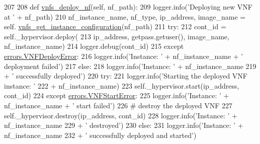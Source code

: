 \begin{DoxyCode}
207 
208     \textcolor{keyword}{def }\hyperlink{classvnfs__operations_1_1VNFSOperations_a304bb0780682b050cdf9d43e3f279ead}{vnfs\_deploy\_nf}(self, nf\_path):
209         logger.info(\textcolor{stringliteral}{'Deploying new VNF at '} + nf\_path)
210         nf\_instance\_name, nf\_type, ip\_address, image\_name = self.
      \hyperlink{classvnfs__operations_1_1VNFSOperations_a367f1d6fb6749b0a16af47381d43c874}{vnfs\_get\_instance\_configuration}(nf\_path)
211         \textcolor{keywordflow}{try}:
212             cont\_id  = self.\_hypervisor.deploy(
213                 ip\_address, getpass.getuser(), image\_name, nf\_instance\_name)
214             logger.debug(cont\_id)
215         \textcolor{keywordflow}{except} \hyperlink{classerrors_1_1VNFDeployError}{errors.VNFDeployError}:
216             logger.info(\textcolor{stringliteral}{'Instance: '} + nf\_instance\_name  + \textcolor{stringliteral}{' deployment failed'})
217         \textcolor{keywordflow}{else}:
218             logger.info(\textcolor{stringliteral}{'Instance: '} + nf\_instance\_name  
219                     + \textcolor{stringliteral}{' successfully deployed'})
220             \textcolor{keywordflow}{try}:
221                 logger.info(\textcolor{stringliteral}{'Starting the deployed VNF instance: '} 
222                     + nf\_instance\_name)
223                 self.\_hypervisor.start(ip\_address, cont\_id)
224             \textcolor{keywordflow}{except} \hyperlink{classerrors_1_1VNFStartError}{errors.VNFStartError}:
225                 logger.info(\textcolor{stringliteral}{'Instance: '} + nf\_instance\_name  + \textcolor{stringliteral}{' start failed'})
226                 \textcolor{comment}{# destroy the deployed VNF}
227                 self.\_hypervisor.destroy(ip\_address, cont\_id)
228                 logger.info(\textcolor{stringliteral}{'Instance: '} + nf\_instance\_name  
229                     + \textcolor{stringliteral}{' destroyed'})
230             \textcolor{keywordflow}{else}:
231                 logger.info(\textcolor{stringliteral}{'Instance: '} + nf\_instance\_name  
232                     + \textcolor{stringliteral}{' successfully deployed and started'})

\end{DoxyCode}
